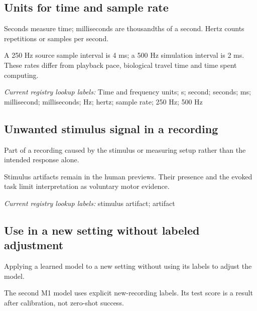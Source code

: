 \begin{samepage}
\subsection*{Units for time and sample rate}
\noindent Seconds measure time; milliseconds are thousandths of a second. Hertz counts repetitions or samples per second.\par
\end{samepage}
\begin{samepage}
\noindent A 250 Hz source sample interval is 4 ms; a 500 Hz simulation interval is 2 ms. These rates differ from playback pace, biological travel time and time spent computing.\par\nopagebreak[4]

\end{samepage}


\noindent\textit{Current registry lookup labels:} Time and frequency units; s; second; seconds; ms; millisecond; milliseconds; Hz; hertz; sample rate; 250 Hz; 500 Hz\par

\begin{samepage}
\subsection*{Unwanted stimulus signal in a recording}
\noindent Part of a recording caused by the stimulus or measuring setup rather than the intended response alone.\par
\end{samepage}
\begin{samepage}
\noindent Stimulus artifacts remain in the human previews. Their presence and the evoked task limit interpretation as voluntary motor evidence.\par\nopagebreak[4]

\end{samepage}


\noindent\textit{Current registry lookup labels:} stimulus artifact; artifact\par

\begin{samepage}
\subsection*{Use in a new setting without labeled adjustment}
\noindent Applying a learned model to a new setting without using its labels to adjust the model.\par
\end{samepage}
\begin{samepage}
\noindent The second M1 model uses explicit new-recording labels. Its test score is a result after calibration, not zero-shot success.\par\nopagebreak[4]

\end{samepage}


